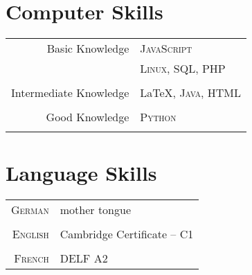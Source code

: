 \documentclass[a4paper,10pt]{article} %
\begin{document}
{\begin{minipage}[t]{0.44\textwidth}

\section{Computer Skills}

\begin{tabular}{rl}
Basic Knowledge         & \textsc{JavaScript}\\
                        & \textsc{Linux}, \textsc{SQL}, \textsc{PHP}\\ \\
Intermediate Knowledge  & \LaTeX, \textsc{Java}, \textsc{HTML}\\ \\
Good Knowledge          & \textsc{Python}\\ \\
\end{tabular}


\section{Language Skills}

\begin{tabular}{rl}
\textsc{German}
& mother tongue\\
& \\
\textsc{English}
& Cambridge Certificate – C1\\
& \\
\textsc{French}
& DELF A2 \\
\end{tabular}\\[10pt]


\end{minipage} %

\begin{minipage}[t]{0.5\textwidth}
\vspace{0pt} %


\end{minipage}}
\end{document}
